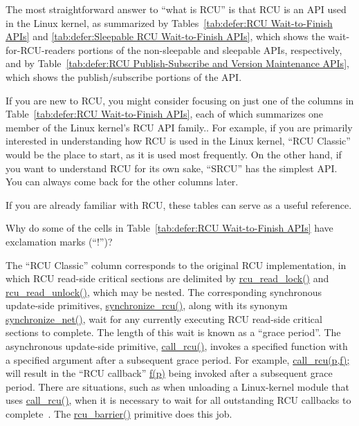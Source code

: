 The most straightforward answer to ``what is RCU'' is that RCU is
an API used in the Linux kernel, as summarized by
Tables~\ref{tab:defer:RCU Wait-to-Finish APIs} and
\ref{tab:defer:Sleepable RCU Wait-to-Finish APIs},
which shows the wait-for-RCU-readers portions of the non-sleepable and
sleepable APIs, respectively,
and by
Table~\ref{tab:defer:RCU Publish-Subscribe and Version Maintenance APIs},
which shows the publish/subscribe portions of the API.

If you are new to RCU, you might consider focusing on just one
of the columns in
Table~\ref{tab:defer:RCU Wait-to-Finish APIs},
each of which summarizes one member of the Linux kernel's RCU API family..
For example, if you are primarily interested in understanding how RCU
is used in the Linux kernel, ``RCU Classic'' would be the place to start,
as it is used most frequently.
On the other hand, if you want to understand RCU for its own sake,
``SRCU'' has the simplest API.
You can always come back for the other columns later.

If you are already familiar with RCU, these tables can
serve as a useful reference.

\QuickQuiz{}
	Why do some of the cells in
	Table~\ref{tab:defer:RCU Wait-to-Finish APIs}
	have exclamation marks (``!'')?
 \QuickQuizEnd

The ``RCU Classic'' column corresponds to the original RCU implementation,
in which RCU read-side critical sections are delimited by
\url{rcu_read_lock()} and \url{rcu_read_unlock()}, which
may be nested.
The corresponding synchronous update-side primitives,
\url{synchronize_rcu()}, along with its synonym
\url{synchronize_net()}, wait for any currently executing
RCU read-side critical sections to complete.
The length of this wait is known as a ``grace period''.
The asynchronous update-side primitive, \url{call_rcu()},
invokes a specified function with a specified argument after a
subsequent grace period.
For example, \url{call_rcu(p,f);} will result in
the ``RCU callback'' \url{f(p)}
being invoked after a subsequent grace period.
There are situations,
such as when unloading a Linux-kernel module that uses \url{call_rcu()},
when it is necessary to wait for all
outstanding RCU callbacks to complete~\cite{PaulEMcKenney2007rcubarrier}.
The \url{rcu_barrier()} primitive does this job.

